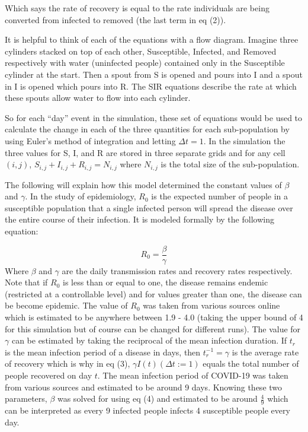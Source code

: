 \documentclass[a4paper]{article}
\begin{document}
Which says the rate of recovery is equal to the rate individuals are being
converted from infected to removed (the last term in eq (2)).

It is helpful to think of each of the equations with a flow diagram. Imagine
three cylinders stacked on top of each other, Susceptible, Infected, and Removed
respectively with water (uninfected people) contained only in the Susceptible cylinder 
at the start. Then a spout from S is opened and pours into I and a spout in I is opened
which pours into R. The SIR equations describe the rate at which these spouts allow 
water to flow into each cylinder.

So for each ``day'' event in the simulation, these set of equations would be
used to calculate the change in each of the three quantities for each sub-population 
by using Euler's method of integration and letting $\Delta t=1$. In the simulation the
three values for S, I, and R are stored in three separate grids and for any cell
${(i,j)}$, $S_{i,j} + I_{i,j} + R_{i,j} = N_{i,j}$ where $N_{i,j}$ is the total
size of the sub-population.


The following will explain how this model determined the constant values of 
$\beta$ and $\gamma$. In the study of epidemiology, $R_0$ is the expected number 
of people in a susceptible population that a single infected person will spread 
the disease over the entire course of their infection. It is modeled formally by 
the following equation:

\begin{equation}
  R_0 = \frac{\beta}{\gamma}
\end{equation}
Where $\beta$ and $\gamma$ are the daily transmission rates and recovery rates
respectively. Note that if $R_0$ is less than or equal to one, the disease remains endemic
(restricted at a controllable level) and for values greater than one, the
disease can be become epidemic. The value of $R_0$ was taken from various
sources online which is estimated to be anywhere between 1.9 - 4.0 (taking the
upper bound of 4 for this simulation but of course can be changed for different runs). 
The value for $\gamma$ can be estimated by taking the reciprocal of the mean
infection duration. If $t_r$ is the mean infection period of a disease in days,
then $t_r^{-1} = \gamma$ is the average rate of recovery which is why in eq (3),
$\gamma I(t)(\Delta t:=1)$ equals the total number of people recovered on day $t$.
The mean infection period of COVID-19 was taken from various sources and estimated to 
be around 9 days. Knowing these two parameters, $\beta$ was solved for using eq (4) and estimated to be around $\frac{4}{9}$ which
can be interpreted as every 9 infected people infects 4 susceptible people every
day.
\end{document}
